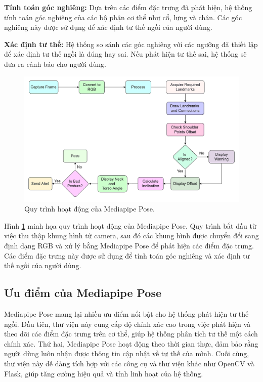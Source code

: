 \documentclass[conference]{IEEEtran}
\begin{document}
 \textbf{Tính toán góc nghiêng:} Dựa trên các điểm đặc trưng đã phát hiện, hệ thống tính toán góc nghiêng của các bộ phận cơ thể như cổ, lưng và chân. Các góc nghiêng này được sử dụng để xác định tư thế ngồi của người dùng.

\textbf{Xác định tư thế:} Hệ thống so sánh các góc nghiêng với các ngưỡng đã thiết lập để xác định tư thế ngồi là đúng hay sai. Nếu phát hiện tư thế sai, hệ thống sẽ đưa ra cảnh báo cho người dùng.

\begin{figure}[H]
    \centering
    \includegraphics[width=0.9\linewidth]{images/mediapipe_workflow.png}
    \caption{Quy trình hoạt động của Mediapipe Pose.}
    \label{fig:mediapipe_workflow}
\end{figure}

Hình \ref{fig:mediapipe_workflow} minh họa quy trình hoạt động của Mediapipe Pose. Quy trình bắt đầu từ việc thu thập khung hình từ camera, sau đó các khung hình được chuyển đổi sang định dạng RGB và xử lý bằng Mediapipe Pose để phát hiện các điểm đặc trưng. Các điểm đặc trưng này được sử dụng để tính toán góc nghiêng và xác định tư thế ngồi của người dùng.

\subsection{Ưu điểm của Mediapipe Pose}
Mediapipe Pose mang lại nhiều ưu điểm nổi bật cho hệ thống phát hiện tư thế ngồi. Đầu tiên, thư viện này cung cấp độ chính xác cao trong việc phát hiện và theo dõi các điểm đặc trưng trên cơ thể, giúp hệ thống phân tích tư thế một cách chính xác. Thứ hai, Mediapipe Pose hoạt động theo thời gian thực, đảm bảo rằng người dùng luôn nhận được thông tin cập nhật về tư thế của mình. Cuối cùng, thư viện này dễ dàng tích hợp với các công cụ và thư viện khác như OpenCV và Flask, giúp tăng cường hiệu quả và tính linh hoạt của hệ thống.
\end{document}
